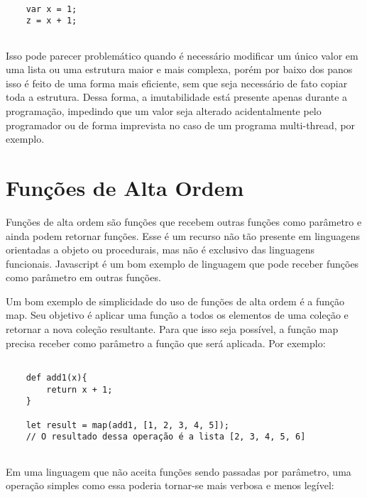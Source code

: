 \begin{lstlisting}[caption={Exemplo de Código Imutável},label=imutablevar]

    var x = 1;
    z = x + 1;


\end{lstlisting}

Isso pode parecer problemático quando é necessário 
modificar um único valor em uma lista ou uma estrutura 
maior e mais complexa, porém por baixo dos panos isso 
é feito de uma forma mais eficiente, sem que seja 
necessário de fato copiar toda a estrutura. Dessa forma, 
a imutabilidade está presente apenas durante a 
programação, impedindo que um valor seja alterado 
acidentalmente pelo programador ou de forma imprevista 
no caso de um programa multi-thread, por exemplo.


\section{Funções de Alta Ordem}

Funções de alta ordem são funções que recebem 
outras funções como parâmetro e ainda podem 
retornar funções.\cite{realworldhaskell} \cite{functionalscala} Esse é um recurso 
não tão presente em linguagens orientadas a 
objeto ou procedurais, mas não é exclusivo das 
linguagens funcionais. Javascript é um bom 
exemplo de linguagem que pode receber funções 
como parâmetro em outras funções. \cite{eloquentjs}

Um bom exemplo de simplicidade do uso de 
funções de alta ordem é a função map.\cite{hofscala} Seu objetivo 
é aplicar uma função a todos os elementos de uma 
coleção e retornar a nova coleção resultante. 
Para que isso seja possível, a função map precisa 
receber como parâmetro a função que será aplicada. 
Por exemplo:

\begin{lstlisting}[caption={Exemplo de Função de Alta Ordem},label=hof]

    def add1(x){
        return x + 1;
    }

    let result = map(add1, [1, 2, 3, 4, 5]);
    // O resultado dessa operação é a lista [2, 3, 4, 5, 6]
        

\end{lstlisting}

Em uma linguagem que não aceita funções sendo 
passadas por parâmetro, uma operação simples como 
essa poderia tornar-se mais verbosa e menos legível:

